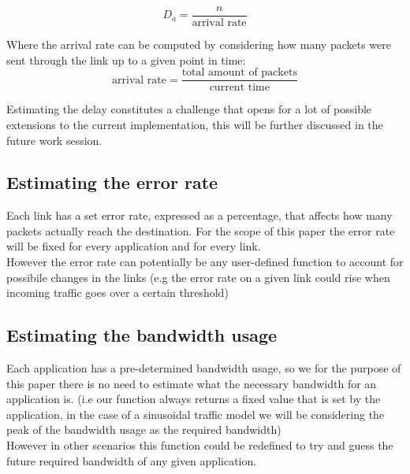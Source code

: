 \[
	D_a =  \frac {n} {\text{arrival rate}}
\]

Where the arrival rate can be computed by considering how many packets were sent through the link up to a given point in time:
\[
	\text{arrival rate} = \frac {\text{total amount of packets}} {\text{current time}}
\]

Estimating the delay constitutes a challenge that opens for a lot of possible extensions to the current implementation, this will be further discussed in the future work session.


\subsection{Estimating the error rate} \label{estimating_the_error_rate}

Each link has a set error rate, expressed as a percentage, that affects how many packets actually reach the destination. For the scope of this paper the error rate will be fixed for every application and for every link. \\
However the error rate can potentially be any user-defined function to account for possibile changes in the links (e.g the error rate on a given link could rise when incoming traffic goes over a certain threshold)



\subsection{Estimating the bandwidth usage} \label{estimating_the_bandwidth_usage}

Each application has a pre-determined bandwidth usage, so we for the purpose of this paper there is no need to estimate what the necessary bandwidth for an application is. (i.e our function always returns a fixed value that is set by the application, in the case of a sinusoidal traffic model we will be considering the peak of the bandwidth usage as the required bandwidth) \\
However in other scenarios this function could be redefined to try and guess the future required bandwidth of any given application.